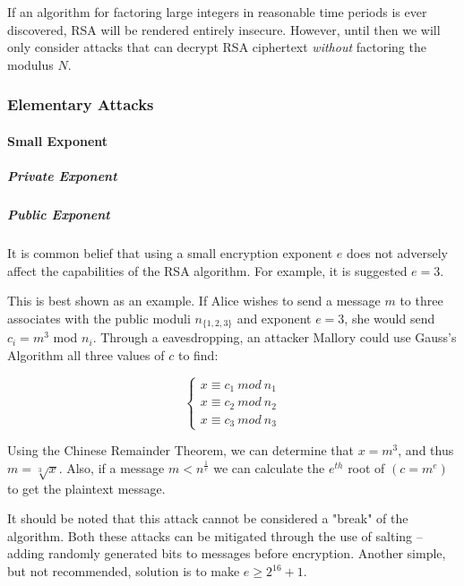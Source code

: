       If an algorithm for factoring large integers in reasonable time periods is ever discovered, RSA will be rendered entirely insecure. However, until then we will only consider attacks that can decrypt RSA ciphertext \emph{without} factoring the modulus $N$.
    
    \subsubsection{Elementary Attacks}
    
      \paragraph{Small Exponent}
  
        \subparagraph{Private Exponent}
        \subparagraph{Public Exponent}
        
          It is common belief that using a small encryption exponent $e$ does not adversely affect the capabilities of the RSA algorithm. For example, it is suggested $e=3$.
          
          This is best shown as an example. If Alice wishes to send a message $m$ to three associates with the public moduli $n_{\{1,2,3\}}$ and exponent $e=3$, she would send $c_i = m^3$ mod $n_i$. Through a eavesdropping, an attacker Mallory could use Gauss's Algorithm all three values of $c$ to find:
          
          \[
          	\left\{
          	\begin{array}{ll}
                    x \equiv c_1 \  mod \  n_1 \\
                    x \equiv c_2 \  mod \  n_2\\
                    x \equiv c_3 \  mod \  n_3
                  \end{array}
                  \right.
          \]
          
          Using the Chinese Remainder Theorem, we can determine that $x = m^3$, and thus $m = \sqrt[3]{x}$. Also, if a message $m < n^{\frac{1}{e}}$ we can calculate the $e^{th}$ root of $(c=m^e)$ to get the plaintext message.
          
          It should be noted that this attack cannot be considered a "break" of the algorithm. Both these attacks can be mitigated through the use of salting -- adding randomly generated bits to messages before encryption. Another simple, but not recommended, solution is to make $e \geq 2^{16}+1$.
                    
